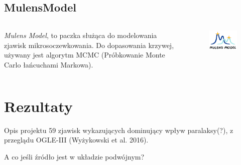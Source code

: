 \documentclass{beamer}
\begin{document}
\subsection{MulensModel}
\begin{frame}
    \begin{columns}
        \begin{column}{0.5\linewidth}
            \emph{Mulens Model}, to paczka służąca do modelowania zjawisk mikrosoczewkowania.
            Do dopasowania krzywej, używany jest algorytm MCMC (Próbkowanie Monte Carlo łańcuchami Markowa).

        \end{column}

        \begin{column}{0.5\linewidth}
            \begin{figure}
                \includegraphics[width = \textwidth]{logoMM_crop_4_372x260.png}
            \end{figure}
        \end{column}
    \end{columns}
\end{frame}

\section{Rezultaty}

\begin{frame}{Opis projektu}
    59 zjawisk wykazujących dominujący wpływ paralaksy(?), z przeglądu OGLE-III (Wyżykowski et al. 2016).

    \bigskip
    \bigskip

    A co jeśli źródło jest w układzie podwójnym?
\end{frame}
\end{document}
